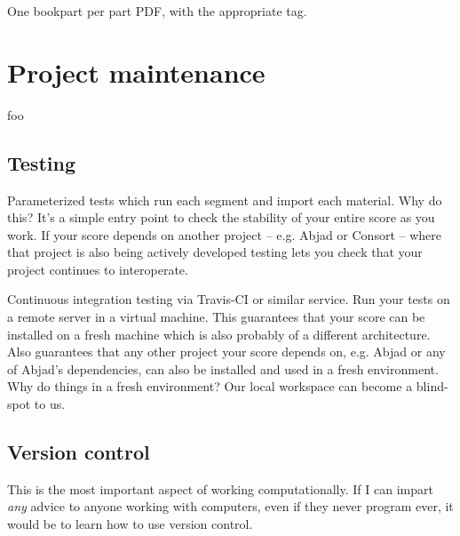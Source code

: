 One bookpart per part PDF, with the appropriate tag.

\section{Project maintenance}

foo

\subsection{Testing}

Parameterized tests which run each segment and import each material. Why do
this? It's a simple entry point to check the stability of your entire score as
you work. If your score depends on another project -- e.g. Abjad or Consort --
where that project is also being actively developed testing lets you check that
your project continues to interoperate.

Continuous integration testing via Travis-CI or similar service. Run your tests
on a remote server in a virtual machine. This guarantees that your score can be
installed on a fresh machine which is also probably of a different
architecture. Also guarantees that any other project your score depends on,
e.g. Abjad or any of Abjad's dependencies, can also be installed and used in a
fresh environment. Why do things in a fresh environment? Our local workspace
can become a blind-spot to us.

\subsection{Version control}

This is the most important aspect of working computationally. If I can impart
\emph{any} advice to anyone working with computers, even if they never program
ever, it would be to learn how to use version control.